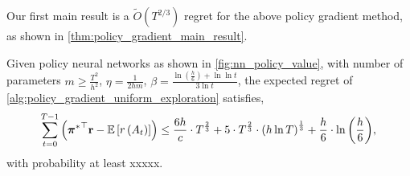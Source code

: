 Our first main result is a $\tilde{O}(T^{2/3})$ regret for the above policy gradient method, as shown in \cref{thm:policy_gradient_main_result}.

\begin{thm}
\label{thm:policy_gradient_main_result}
    Given policy neural networks as shown in \cref{fig:nn_policy_value}, with number of parameters $m \ge \frac{T^2}{h^2}$, $\eta = \frac{1}{2 h m}$, $\beta = \frac{ \ln{\left(\frac{h}{6}\right) + \ln{\ln{t}} } }{ 3 \ln{t}}$, the expected regret of \cref{alg:policy_gradient_uniform_exploration} satisfies,
\begin{equation*}
\begin{split}
    \sum\limits_{t=0}^{T-1}{ \left( {{\boldsymbol{\pi}}^*}^\top {\mathbf{r}} - {\mathbb{E}} \left[ r\left(A_t\right) \right] \right)} \le \frac{6 h}{c} \cdot  T^{\frac{2}{3}} + 5 \cdot T^{\frac{2}{3}} \cdot \left( h \ln{T} \right)^{\frac{1}{3}} + \frac{h}{6} \cdot \ln{ \left( \frac{h}{6} \right) },
\end{split}
\end{equation*}
with probability at least xxxxx. 
\end{thm}
